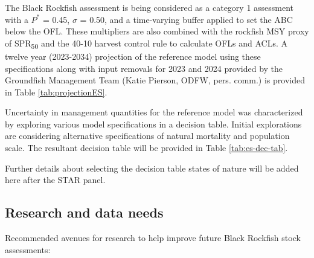 \documentclass[11pt,
  letterpaper,
]{article}
\begin{document}
The Black Rockfish assessment is being considered as a category 1 assessment with a \(P^*\) = 0.45, \(\sigma\) = 0.50, and a time-varying buffer applied to set the ABC below the OFL. These multipliers are also combined with the rockfish MSY proxy of SPR\textsubscript{50} and the 40-10 harvest control rule to calculate OFLs and ACLs. A twelve year (2023-2034) projection of the reference model using these specifications along with input removals for 2023 and 2024 provided by the Groundfish Management Team (Katie Pierson, ODFW, pers. comm.) is provided in Table \ref{tab:projectionES}.



Uncertainty in management quantities for the reference model was characterized by exploring various model specifications in a decision table. Initial explorations are considering alternative specifications of natural mortality and population scale. The resultant decision table will be provided in Table \ref{tab:es-dec-tab}.

Further details about selecting the decision table states of nature will be added here after the STAR panel.

\clearpage



\clearpage

\hypertarget{research-and-data-needs}{%
\subsection*{Research and data needs}\label{research-and-data-needs}}

Recommended avenues for research to help improve future Black Rockfish stock assessments:
\end{document}

